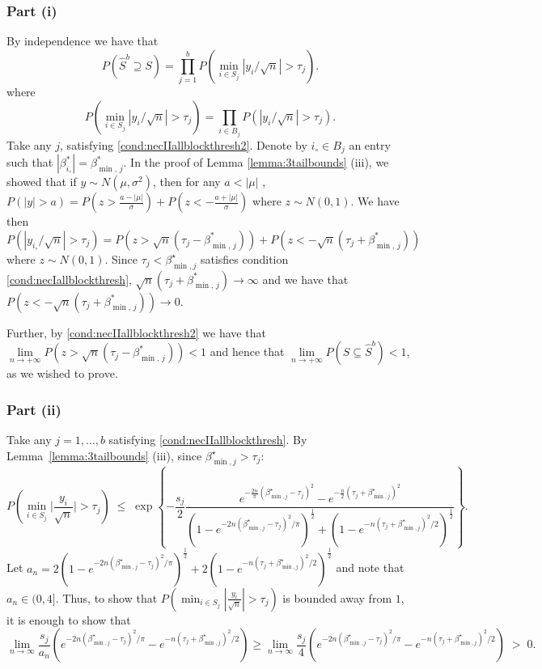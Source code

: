 \documentclass[aos]{imsart}
\theoremstyle{plain}
\begin{document}
\subsubsection{Part (i)} By independence we have that
$$P(\hat{S}^{b}\supseteq S)=\prod_{j=1}^b P(\min_{i \in S_j}|y_i/\sqrt{n}| > \tau_j).$$ 
where
$$
P(\min_{i \in S_j}|y_i/\sqrt{n}| > \tau_j)=\prod_{i \in B_j} P(|y_i/\sqrt{n}| > \tau_j). 
$$
Take any $j$, satisfying \eqref{cond:necIIallblockthresh2}. 
Denote by $i_{\circ}\in B_j$ an entry such that $|\beta_{i_{\circ}}^*|=\beta^*_{\min,\,j}$. In the proof of Lemma \ref{lemma:3tailbounds} (iii), we showed that if $y\sim N(\mu, \sigma^2)$, then for any $a<|\mu|$ , $P(|y|>a)  = P(z>\frac{a-|\mu|}{\sigma}) + P(z<-\frac{a+|\mu|}{\sigma})$ where $z\sim N(0,1)$. We have then
$$P(|y_{i_{\circ}}/\sqrt{n}|>\tau_j) 
    = P\left(z>\sqrt{n}\left(\tau_j-\beta_{\min,\,j}^*\right)\right) + P\left(z<-\sqrt{n}\left(\tau_j+\beta_{\min,\,j}^*\right)\right)$$ where $z\sim N(0,1)$. Since $\tau_j<\beta^\star_{\min,j}$ satisfies condition \eqref{cond:necIallblockthresh}, $\sqrt{n}\left(\tau_j+\beta_{\min,\,j}^*\right)\to\infty$ and we have that $P(z<-\sqrt{n}\left(\tau_j+\beta_{\min,\,j}^*\right)) \to 0$.
    
    Further,  by \eqref{cond:necIIallblockthresh2}  we have that $\underset{n \to +\infty}{\lim}P\left(z>\sqrt{n}\left(\tau_j-\beta_{\min,\,j}^*\right)\right)<1$ and hence that $\underset{n \to +\infty}{\lim}P\left(S \subseteq \hat{S}^{b} \right)<1$, as we wished to prove.
    
\subsubsection{Part (ii)}	
Take any $j=1,\ldots,b$ satisfying \eqref{cond:necIIallblockthresh}. By Lemma~\ref{lemma:3tailbounds} (iii), since $\beta^\star_{\min,j}>\tau_j$:
$$P\left(\min_{i \in S_j}\Big|\frac{y_i}{\sqrt{n}}\Big| > \tau_j \right)\;\leq\;
\exp\left\{-\frac{s_j}{2}\frac{e^{-\tfrac{2n}{\pi}(\beta^\star_{\min,j}-\tau_j)^2}-e^{-\tfrac{n}{2}(\tau_j+\beta^\star_{\min,j})^2}}{\left(1-e^{-2n(\beta^\star_{\min,j}-\tau_j)^2/\pi}\right)^{\frac{1}{2}}+\left(1-e^{-n(\tau_j+\beta^\star_{\min,j})^2/2}\right)^{\frac{1}{2}}}\right\}. $$
Let $a_{n}=2\left(1-e^{-2n(\beta^\star_{\min,j}-\tau_j)^2/\pi}\right)^{\frac{1}{2}}+2\left(1-e^{-n(\tau_j+\beta^\star_{\min,j})^2/2}\right)^{\frac{1}{2}}$ and note that $a_n\in (0, 4]$.  Thus, to show that $P\left(\min_{i \in S_j}|\tfrac{y_i}{\sqrt{n}}| > \tau_j \right)$ is bounded away from $1$, it is enough to show that 
$$
\lim_{n\to \infty} \frac{s_j}{a_n}({e^{-2n(\beta^\star_{\min,j}-\tau_j)^2/\pi}-e^{-n(\tau_j+\beta^\star_{\min,j})^2/2}})
\geq \lim_{n\to \infty} \frac{s_j}{4}({e^{-2n(\beta^\star_{\min,j}-\tau_j)^2/\pi}-e^{-n(\tau_j+\beta^\star_{\min,j})^2/2}})
\;>\;0.
$$
\end{document}

